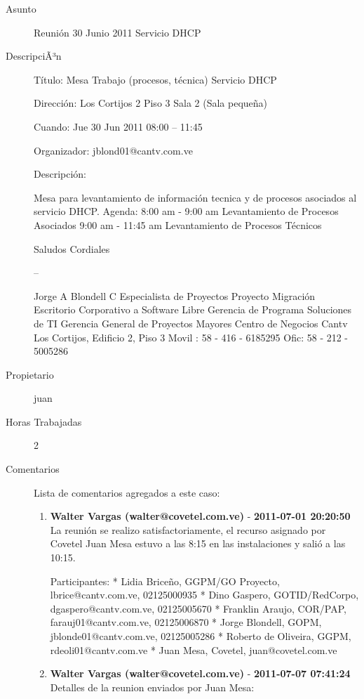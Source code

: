 \begin{description}

\item[Asunto] Reunión 30 Junio 2011 Servicio DHCP\item[DescripciÃ³n] Título: Mesa Trabajo (procesos, técnica) Servicio DHCP

Dirección: Los Cortijos 2 Piso 3 Sala 2 (Sala pequeña)

Cuando: Jue 30 Jun 2011 08:00 – 11:45

Organizador: jblond01@cantv.com.ve

Descripción:

Mesa para levantamiento de información tecnica y de procesos asociados 
al servicio DHCP.
  Agenda:
  8:00 am - 9:00 am Levantamiento de Procesos Asociados
  9:00 am - 11:45 am Levantamiento de Procesos Técnicos

Saludos Cordiales

-- 

Jorge A Blondell C
Especialista de Proyectos
Proyecto Migración Escritorio Corporativo a Software Libre
Gerencia de Programa Soluciones de TI
Gerencia General de Proyectos Mayores
Centro de Negocios Cantv Los Cortijos, Edificio 2, Piso 3
Movil : 58 - 416 - 6185295
Ofic:   58 - 212 - 5005286
\item[Propietario] juan\item[Horas Trabajadas] 2

\item[Comentarios] Lista de comentarios agregados a este caso:  
\begin{enumerate}
        \item {\bfseries Walter Vargas (walter@covetel.com.ve)  } - {\bfseries 2011-07-01 20:20:50} \\ La reunión se realizo satisfactoriamente, el recurso asignado por Covetel Juan
Mesa estuvo a las 8:15 en las instalaciones y salió a las 10:15.

Participantes:
* Lidia Briceño, GGPM/GO Proyecto, lbrice@cantv.com.ve, 02125000935
* Dino Gaspero, GOTID/RedCorpo, dgaspero@cantv.com.ve, 02125005670
* Franklin Araujo, COR/PAP, farauj01@cantv.com.ve, 02125006870
* Jorge Blondell, GOPM, jblonde01@cantv.com.ve, 02125005286
* Roberto de Oliveira, GGPM, rdeoli01@cantv.com.ve
* Juan Mesa, Covetel, juan@covetel.com.ve        \item {\bfseries Walter Vargas (walter@covetel.com.ve)  } - {\bfseries 2011-07-07 07:41:24} \\ Detalles de la reunion enviados por Juan Mesa:


\end{enumerate}
\end{description}
